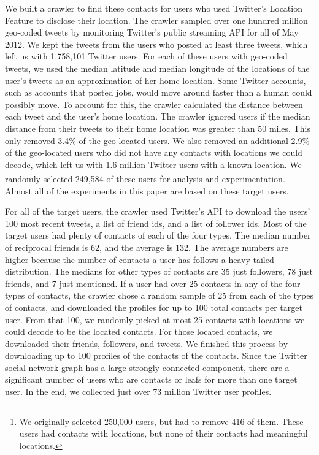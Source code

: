 \documentclass[letterpaper]{article}
\begin{document}
We built a crawler to find these contacts for users who used Twitter's Location
Feature to disclose their location.
%
The crawler sampled over one hundred million geo-coded tweets by monitoring
Twitter's public streaming API for all of May 2012.
We kept the tweets from the users who posted at least three tweets, which left
us with 1,758,101 Twitter users.
%
For each of these users with geo-coded tweets, we used the median latitude and
median longitude of the locations of the user's tweets as an approximation of
her home location.
%
Some Twitter accounts, such as accounts that posted jobs, would
move around faster than a human could possibly move.
%
To account for this, the crawler calculated the distance between each tweet and
the user's home location.
%
The crawler ignored users if the median distance from their tweets to their
home location was greater than 50 miles.
%
This only removed 3.4\% of the geo-located users.
%
We also removed an additional 2.9\% of the geo-located users who did not have
any contacts with locations we could decode, which left us with 1.6 million
Twitter users with a known location.
%
We randomly selected 249,584 of these users for analysis and experimentation.
\ifdefined\THESIS
\footnote{We originally selected 250,000 users, but had to remove 416 of them.
These users had contacts with locations, but none of their contacts had
meaningful locations.}
\fi
%
Almost all of the experiments in this paper are based on these target
users.



For all of the target users, the crawler used Twitter's API to download
the users' 100 most recent tweets, a list of friend ids, and a list of follower ids.
%
Most of the target users had plenty of contacts of each of the four types.
%
The median number of reciprocal friends is 62, and the average is 132.
%
The average numbers are higher because the number of contacts a user has
follows a heavy-tailed distribution.
%
The medians for other types of contacts are 35 just followers, 78 just friends,
and 7 just mentioned.
%
If a user had over 25 contacts in any of the four types of contacts, the
crawler chose a random sample of 25 from each of the types of contacts, and
downloaded the profiles for up to 100 total contacts per target user.
%
From that 100, we randomly picked at most 25 contacts with locations we could
decode to be the located contacts. For those located contacts, we downloaded
their friends, followers, and tweets.
%
We finished this process by downloading up to 100 profiles of the contacts of
the contacts.
%
Since the Twitter social network graph has a large strongly connected
component, there are a significant number of users who are contacts or leafs for
more than one target user.
%
In the end, we collected just over 73 million Twitter user profiles.
\end{document}
